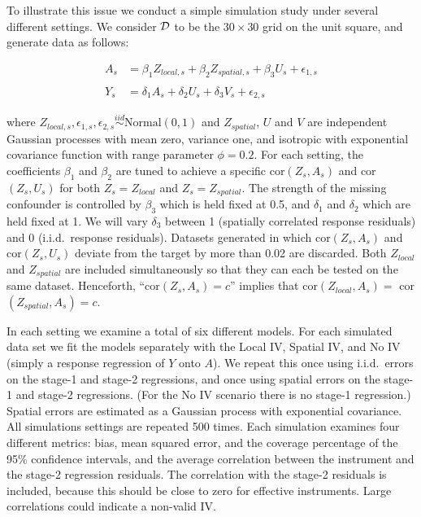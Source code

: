 \documentclass[12pt]{article}
\begin{document}
To illustrate this issue we conduct a simple simulation study under several different settings. We consider $\cal D$ to be the $30 \times 30$ grid on the unit square, and generate data as follows: 
\begin{singlespace}
\begin{align*}
    A_s &= \beta_1 Z_{local,s} + \beta_2 Z_{spatial,s} + \beta_3 U_s + \epsilon_{1,s} \\ \\
    Y_s &= \delta_1 A_s +  \delta_2 U_s + \delta_3 V_s + \epsilon_{2,s}
\end{align*}
\end{singlespace}
\noindent where $Z_{local,s},\epsilon_{1,s},\epsilon_{2,s} \stackrel{iid}{\sim} \mbox{Normal}(0,1)$ and $Z_{spatial}$, $U$ and $V$ are independent Gaussian processes with mean zero, variance one, and isotropic with exponential covariance function with range parameter $\phi=0.2$. For each setting, the coefficients $\beta_1$ and $\beta_2$ are tuned to achieve a specific cor$(Z_s,A_s)$ and cor$(Z_s,U_s)$ for both $Z_s = Z_{local}$ and $Z_s = Z_{spatial}$. The strength of the missing confounder is controlled by $\beta_3$ which is held fixed at 0.5, and $\delta_1$ and $\delta_2$ which are held fixed at 1. We will vary $\delta_3$ between 1 (spatially correlated response residuals) and 0 (i.i.d.~response residuals).  Datasets generated in which cor$(Z_s,A_s)$ and cor$(Z_s,U_s)$ deviate from the target by more than 0.02 are discarded. Both $Z_{local}$ and $Z_{spatial}$ are included simultaneously so that they can each be tested on the same dataset.  Henceforth, ``cor$(Z_s,A_s)= c$'' implies that cor$(Z_{local},A_s) =$ cor$(Z_{spatial},A_s)= c$.

In each setting we examine a total of six different models. For each simulated data set we fit the models separately with the Local IV, Spatial IV, and No IV (simply a response regression of $Y$ onto $A$). We repeat this once using i.i.d.~errors on the stage-1 and stage-2 regressions, and once using spatial errors on the stage-1 and stage-2 regressions. (For the No IV scenario there is no stage-1 regression.) Spatial errors are estimated as a Gaussian process with exponential covariance. All simulations settings are repeated 500 times. Each simulation examines four different metrics: bias, mean squared error, and the coverage percentage of the 95\% confidence intervals, and the average correlation between the instrument and the stage-2 regression residuals. The correlation with the stage-2 residuals is included, because this should be close to zero for effective instruments. Large correlations could indicate a non-valid IV.
\end{document}
